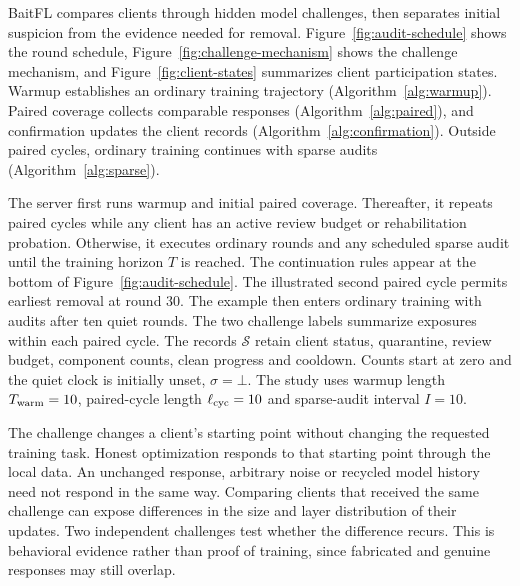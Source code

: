 \documentclass[conference]{IEEEtran}
\makeatletter
\renewcommand{\section}{\@startsection{section}{1}{\z@}{1.5ex}{0.7ex}{\normalfont\normalsize\centering\scshape}}
\makeatother
\begin{document}
\section{Proposed Methodology}\label{sec:method}
BaitFL compares clients through hidden model challenges, then separates
initial suspicion from the evidence needed for removal.
Figure~\ref{fig:audit-schedule} shows the round schedule,
Figure~\ref{fig:challenge-mechanism} shows the challenge mechanism, and
Figure~\ref{fig:client-states} summarizes client participation states.
Warmup establishes an ordinary training trajectory
(Algorithm~\ref{alg:warmup}). Paired coverage collects comparable responses
(Algorithm~\ref{alg:paired}), and confirmation updates the client records
(Algorithm~\ref{alg:confirmation}). Outside paired cycles, ordinary training
continues with sparse audits (Algorithm~\ref{alg:sparse}).

The server first runs warmup and initial paired coverage. Thereafter, it
repeats paired cycles while any client has an active review budget or
rehabilitation probation. Otherwise, it executes ordinary rounds and any
scheduled sparse audit until the training horizon $T$ is reached. The
continuation rules appear at the bottom of Figure~\ref{fig:audit-schedule}.
The illustrated second paired cycle permits earliest removal at round 30.
The example then enters ordinary training with audits after ten quiet rounds.
The two challenge labels summarize exposures within each paired cycle.
The records $\mathcal S$ retain client status, quarantine, review budget,
component counts, clean progress and cooldown. Counts start at zero and
the quiet clock is initially unset, $\sigma=\bot$. The study uses warmup length
$T_{\rm warm}=10$, paired-cycle length $\ell_{\rm cyc}=10$ and sparse-audit interval $I=10$.

The challenge changes a client's starting point without changing the
requested training task. Honest optimization responds to that starting
point through the local data. An unchanged response, arbitrary noise or
recycled model history need not respond in the same way. Comparing
clients that received the same challenge can expose differences in the
size and layer distribution of their updates. Two independent challenges
test whether the difference recurs. This is behavioral evidence rather
than proof of training, since fabricated and genuine responses may still
overlap.
\end{document}
